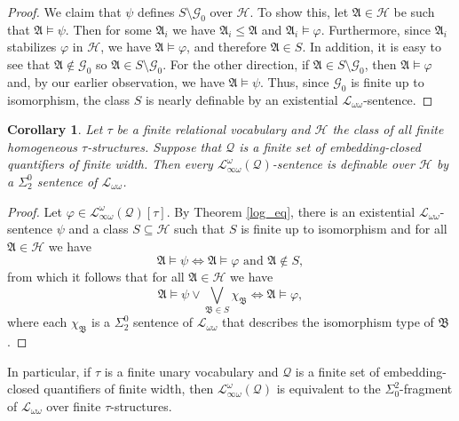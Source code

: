 \documentclass{ndjflart}
\theoremstyle{plain}
\newtheorem{corollary}[conjecture]{Corollary}
\theoremstyle{definition}
\numberwithin{equation}{section}
\begin{document}
\begin{proof}
We claim that $\psi$ defines $S \setminus \mathcal{G}_0$ over $\mathcal{H}$.
To show this, let $\mathfrak{A} \in \mathcal{H}$ be such that $\mathfrak{A} \vDash \psi$.
Then for some $\mathfrak{A}_i$ we have $\mathfrak{A}_i \leq \mathfrak{A}$ and $\mathfrak{A}_i \vDash \varphi$.
Furthermore, since $\mathfrak{A}_i$ stabilizes $\varphi$ in $\mathcal{H}$, we have $\mathfrak{A} \vDash \varphi$, and therefore $\mathfrak{A} \in S$.
In addition, it is easy to see that $\mathfrak{A} \notin \mathcal{G}_0$ so $\mathfrak{A} \in S \setminus \mathcal{G}_0$.
For the other direction, if $\mathfrak{A} \in S \setminus \mathcal{G}_0$, then $\mathfrak{A} \vDash \varphi$ and, by our earlier observation, we have $\mathfrak{A} \vDash \psi$.
Thus, since $\mathcal{G}_0$ is finite up to isomorphism, the class $S$ is nearly definable by an existential $\mathcal{L}_{\omega\omega}$-sentence.
\end{proof}

\begin{corollary}
Let $\tau$ be a finite relational vocabulary and $\mathcal{H}$ the class of all finite homogeneous $\tau$-structures. Suppose that $\mathcal{Q}$ is a finite set of embedding-closed quantifiers of finite width. Then every $\mathcal{L}^{\omega}_{\infty\omega}(\mathcal{Q})$-sentence is definable over $\mathcal{H}$ by a $\Sigma^0_2$ sentence of $\mathcal{L}_{\omega\omega}$.
\end{corollary}
\begin{proof}
Let $\varphi \in \mathcal{L}^{\omega}_{\infty\omega}(\mathcal{Q})[\tau]$.
By Theorem \ref{log_eq}, there is an existential $\mathcal{L}_{\omega\omega}$-sentence $\psi$ and a class $S \subseteq \mathcal{H}$ such that $S$ is finite up to isomorphism and for all $\mathfrak{A} \in \mathcal{H}$ we have
\[
	\mathfrak{A} \vDash \psi \Leftrightarrow \mathfrak{A} \vDash \varphi \text{ and } \mathfrak{A} \notin S,
\]
from which it follows that for all $\mathfrak{A} \in \mathcal{H}$ we have
\[
	\mathfrak{A} \vDash \psi \vee \bigvee_{\mathfrak{B} \in S} \chi_{\mathfrak{B}} \Leftrightarrow \mathfrak{A} \vDash \varphi,
\]
where each $\chi_{\mathfrak{B}}$ is a $\Sigma_2^0$ sentence of $\mathcal{L}_{\omega \omega}$ that describes the isomorphism type of $\mathfrak{B}$.
\end{proof}

In particular, if $\tau$ is a finite unary vocabulary and $\mathcal{Q}$ is a finite set of embedding-closed quantifiers of finite width, then $\mathcal{L}_{\infty\omega}^{\omega}(\mathcal{Q})$ is equivalent to the $\Sigma_0^2$-fragment of $\mathcal{L}_{\omega\omega}$ over finite $\tau$-structures.
\end{document}
